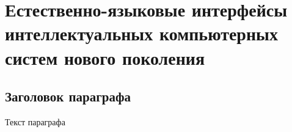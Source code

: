 
\chapter{Естественно-языковые интерфейсы интеллектуальных компьютерных систем нового поколения}
\label{chapter_nl_interfaces}


\section{Заголовок параграфа}
Текст параграфа

%